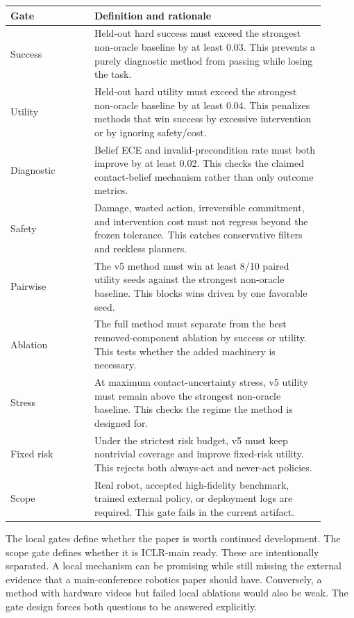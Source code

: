 \documentclass{article}
\begin{document}
\begin{longtable}{p{0.24\linewidth}p{0.66\linewidth}}
\toprule
Gate & Definition and rationale \\
\midrule
Success & Held-out hard success must exceed the strongest non-oracle baseline by at least 0.03. This prevents a purely diagnostic method from passing while losing the task. \\
Utility & Held-out hard utility must exceed the strongest non-oracle baseline by at least 0.04. This penalizes methods that win success by excessive intervention or by ignoring safety/cost. \\
Diagnostic & Belief ECE and invalid-precondition rate must both improve by at least 0.02. This checks the claimed contact-belief mechanism rather than only outcome metrics. \\
Safety & Damage, wasted action, irreversible commitment, and intervention cost must not regress beyond the frozen tolerance. This catches conservative filters and reckless planners. \\
Pairwise & The v5 method must win at least 8/10 paired utility seeds against the strongest non-oracle baseline. This blocks wins driven by one favorable seed. \\
Ablation & The full method must separate from the best removed-component ablation by success or utility. This tests whether the added machinery is necessary. \\
Stress & At maximum contact-uncertainty stress, v5 utility must remain above the strongest non-oracle baseline. This checks the regime the method is designed for. \\
Fixed risk & Under the strictest risk budget, v5 must keep nontrivial coverage and improve fixed-risk utility. This rejects both always-act and never-act policies. \\
Scope & Real robot, accepted high-fidelity benchmark, trained external policy, or deployment logs are required. This gate fails in the current artifact. \\
\bottomrule
\end{longtable}

The local gates define whether the paper is worth continued development. The scope gate defines whether it is ICLR-main ready. These are intentionally separated. A local mechanism can be promising while still missing the external evidence that a main-conference robotics paper should have. Conversely, a method with hardware videos but failed local ablations would also be weak. The gate design forces both questions to be answered explicitly.
\end{document}
